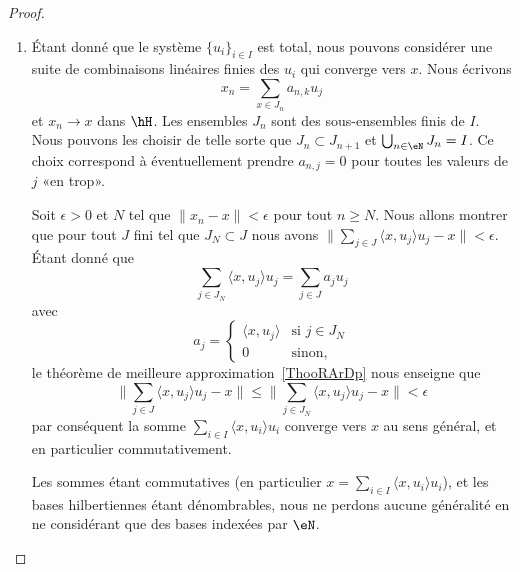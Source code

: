 \begin{proof}
    \begin{enumerate}
        \item
            Étant donné que le système \( \{ u_i \}_{i\in I}\) est total, nous pouvons considérer une suite de combinaisons linéaires finies des \( u_i\) qui converge vers \( x\). Nous écrivons
            \begin{equation}
                x_n=\sum_{x\in J_n}a_{n,k}u_j
            \end{equation}
            et \( x_n\to x\) dans \( \hH\). Les ensembles \( J_n\) sont des sous-ensembles finis de \( I\). Nous pouvons les choisir de telle sorte que \( J_n\subset J_{n+1}\) et \( \bigcup_{n\in \eN}J_n=I\). Ce choix correspond à éventuellement prendre \( a_{n,j}=0\) pour toutes les valeurs de \( j\) «en trop».

            Soit \( \epsilon>0\) et \( N\) tel que \( \| x_n-x \|<\epsilon\) pour tout \( n\geq N\). Nous allons montrer que pour tout \( J\) fini tel que \( J_N\subset J\) nous avons \( \| \sum_{j\in J}\langle x, u_j\rangle u_j-x \|<\epsilon\). Étant donné que
            \begin{equation}
                \sum_{j\in J_N}\langle x, u_j\rangle u_j=\sum_{j\in J}a_ju_j
            \end{equation}
            avec
            \begin{equation}
                a_j=\begin{cases}
                    \langle x, u_j\rangle     &   \text{si } j\in J_N\\
                    0    &    \text{sinon},
                \end{cases}
            \end{equation}
            le théorème de meilleure approximation~\ref{ThooRArDp} nous enseigne que
            \begin{equation}
                \| \sum_{j\in J}\langle x, u_j\rangle u_j-x \|\leq\| \sum_{j\in J_N}\langle x, u_j\rangle u_j-x \|<\epsilon
            \end{equation}
            par conséquent la somme \( \sum_{i\in I}\langle x, u_i\rangle u_i\) converge vers \( x\) au sens général, et en particulier commutativement.

    Les sommes étant commutatives (en particulier \( x=\sum_{i\in I}\langle x, u_i\rangle u_i\)), et les bases hilbertiennes étant dénombrables, nous ne perdons aucune généralité en ne considérant que des bases indexées par \( \eN\).


\end{enumerate}
\end{proof}
